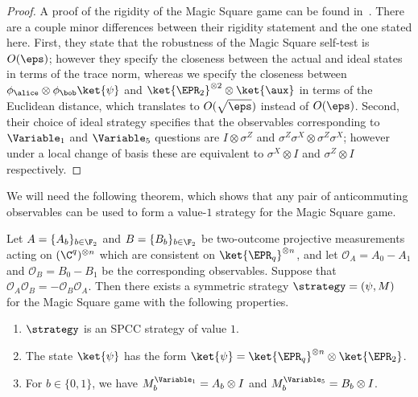\begin{proof}
 	A proof of the rigidity of the Magic Square game can be found in~\cite[Theorem 6.9]{coladangelo2017robust}. There are a couple minor differences between their rigidity statement and the one stated here. First, they state that the robustness of the Magic Square self-test is $O(\eps)$; however they specify the closeness between the actual and ideal states in terms of the trace norm, whereas we specify the closeness between $\phi_\alice \otimes \phi_\bob \ket{\psi}$ and $\ket{\EPR_2}^{\otimes 2}\otimes \ket{\aux}$ in terms of the Euclidean distance, which translates to $O(\sqrt{\eps})$ instead of $O(\eps)$. Second, their choice of ideal strategy specifies that the observables corresponding to $\Variable_1$ and $\Variable_5$ questions are $I \otimes \sigma^Z$ and $\sigma^{Z} \sigma^{X} \otimes \sigma^Z \sigma^X$; however under a local change of basis these are equivalent to $\sigma^X \otimes I$ and $\sigma^Z \otimes I$ respectively.
\end{proof}

We will need the following theorem,
which shows that any pair of anticommuting observables 
can be used to form a value-$1$ strategy for the Magic Square game.

\begin{theorem}
  \label{thm:ms-from-ac}
  Let $A = \{A_b\}_{b \in \F_2}$ and $B = \{B_b\}_{b \in \F_2}$ be two-outcome
  projective measurements acting on $(\C^q)^{\otimes n}$ which are consistent on
  $\ket{\EPR_q}^{\otimes n}$, and let $\mathcal{O}_A = A_0 - A_1$ and
  $\mathcal{O}_B = B_0 - B_1$ be the corresponding observables.
  Suppose that $\mathcal{O}_A \mathcal{O}_B = -\mathcal{O}_B \mathcal{O}_A$.
  Then there exists a symmetric strategy $\strategy = (\psi, M)$ for the Magic
  Square game with the following properties.
  \begin{enumerate}
  \item $\strategy$ is an SPCC strategy of value $1$.
  \item The state $\ket{\psi}$ has the form $\ket{\psi} = \ket{\EPR_q}^{\otimes
      n} \otimes \ket{\EPR_2}$.
  \item For $b \in \{0,1\}$, we have $M^{\Variable_1}_b = A_b \otimes I$ and
    $M^{\Variable_5}_b = B_b \otimes I$.\label{item:embeds}
  \end{enumerate}
\end{theorem}


